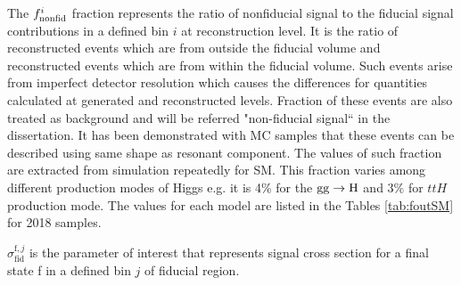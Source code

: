 The $f_{\rm nonfid}^{i}$ fraction represents the ratio of nonfiducial signal to the fiducial signal contributions
in a defined bin $i$ at reconstruction level. It is the ratio of reconstructed events which are from outside the fiducial volume and reconstructed events which are from within the fiducial volume. Such events arise from imperfect detector resolution which causes the differences for quantities calculated at generated and reconstructed levels.
Fraction of these events are also treated as background and will be referred
"non-fiducial signal`` in the dissertation. 
It has been demonstrated with MC samples that these events can be described using same shape as resonant
component. 
The values of such fraction are extracted from simulation repeatedly for SM. This fraction varies among different production modes of Higgs e.g. it is  4\%  for the ${\rm gg}\rightarrow{\rm H}$ and 3\% for $ttH$ production mode. The values for each model are listed in the Tables \ref{tab:foutSM} for 2018 samples. 


$\sigma_{\mathrm{fid}}^{\mathrm{f},j}$ is the parameter of interest that represents signal cross section for a final
state f in a defined bin $j$ of fiducial region.  


